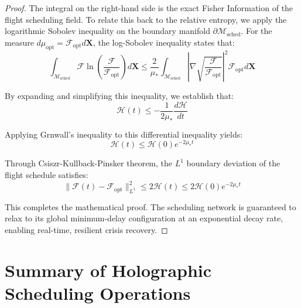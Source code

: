 \documentclass[11pt,a4paper]{book}
\begin{document}
\begin{proof}
The integral on the right-hand side is the exact Fisher Information of the flight scheduling field. To relate this back to the relative entropy, we apply the logarithmic Sobolev inequality on the boundary manifold $\partial\mathcal{M}_{\text{sched}}$. For the measure $d\mu_{\text{opt}} = \mathcal{F}_{\text{opt}} d\mathbf{X}$, the log-Sobolev inequality states that:
\begin{equation}
\label{eq:log_sobolev}
\int_{\mathcal{M}_{\text{sched}}} \mathcal{F} \ln \left(\frac{\mathcal{F}}{\mathcal{F}_{\text{opt}}}\right) d\mathbf{X} \le \frac{2}{\mu_*} \int_{\mathcal{M}_{\text{sched}}} \left| \nabla \sqrt{\frac{\mathcal{F}}{\mathcal{F}_{\text{opt}}}} \right|^2 \mathcal{F}_{\text{opt}} d\mathbf{X}
\end{equation}

By expanding and simplifying this inequality, we establish that:
\begin{equation}
\label{eq:log_sobolev_simplified}
\mathcal{H}(t) \le -\frac{1}{2\mu_*} \frac{d\mathcal{H}}{dt}
\end{equation}

Applying Grnwall's inequality to this differential inequality yields:
\begin{equation}
\label{eq:entropy_decay_result}
\mathcal{H}(t) \le \mathcal{H}(0) e^{-2 \mu_* t}
\end{equation}

Through Csiszr-Kullback-Pinsker theorem, the $L^1$ boundary deviation of the flight schedule satisfies:
\begin{equation}
\|\mathcal{F}(t) - \mathcal{F}_{\text{opt}}\|^2_{L^1} \le 2 \mathcal{H}(t) \le 2 \mathcal{H}(0) e^{-2 \mu_* t}
\end{equation}

This completes the mathematical proof. The scheduling network is guaranteed to relax to its global minimum-delay configuration at an exponential decay rate, enabling real-time, resilient crisis recovery.
\end{proof}

\section{Summary of Holographic Scheduling Operations}
\end{document}
